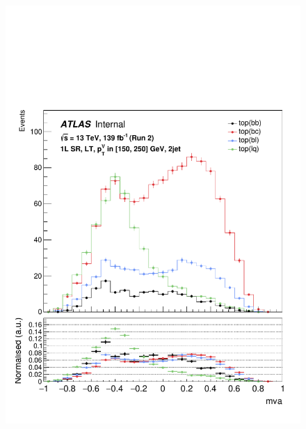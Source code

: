 \begin{figure}[h!]
\includegraphics[scale=0.253]{Images/VH/top/OneLepton_top_2lttag2jet_SR_150_250ptv_mva.pdf}

\end{figure}

